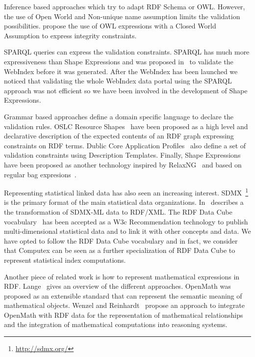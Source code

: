 \documentclass{acm_proc_article-sp}
\begin{document}
Inference based approaches which try to adapt
RDF Schema or OWL. However, the use of Open World and Non-unique name assumption limits the
validation possibilities. \cite{ClarkSirin13,Tiao10,Motik07} propose the use of OWL expressions with a Closed World Assumption to express integrity constraints. 

SPARQL queries can express the validation constraints. SPARQL has much more expressiveness than Shape Expressions and was proposed in~\cite{Labra13} to validate the WebIndex before it was generated. 
After the WebIndex has been launched we noticed that validating the whole WebIndex data portal using the
SPARQL approach was not efficient so we have been involved in the development of Shape Expressions. 

Grammar based approaches define a domain specific language to declare the validation rules. 
OSLC Resource Shapes~\cite{OSLCResourceShapes} 
have been proposed as a high level and declarative description of the expected contents of an RDF graph expressing constraints
on RDF terms. Dublic Core Application Profiles~\cite{KarenCoyleTomBaker13} also define a set of validation constraints using Description Templates. Finally, Shape Expressions have been proposed as another technology inspired by RelaxNG~\cite{RelaxNG} and based on regular bag expresions~\cite{Boneva2014}.

Representing statistical linked data has also seen an increasing interest. 
SDMX~\footnote{\url{http://sdmx.org/}} is the primary format of the main statistical data organizations. In~\cite{Capadisli13} describes a the transformation of SDMX-ML data to RDF/XML. 
The RDF Data Cube vocabulary~\cite{Cube} has been accepted as a W3c Recommendation technology to publish multi-dimensional statistical data and to link it with other concepts and data. 
We have opted to follow the RDF Data Cube vocabulary and in fact, we consider that Computex can be seen as a further specialization of RDF Data Cube to represent statistical index computations.

Another piece of related work is how to represent mathematical expressions in RDF. 
Lange~\cite{Lange13} gives an overview of the different approaches. 
OpenMath was proposed as an extensible standard that can represent the semantic meaning of mathematical objects. 
Wenzel and Reinhardt~\cite{Wenzel12} 
propose an approach to integrate OpenMath with
RDF data for the representation of mathematical relationships and the integration
of mathematical computations into reasoning systems.
\end{document}
